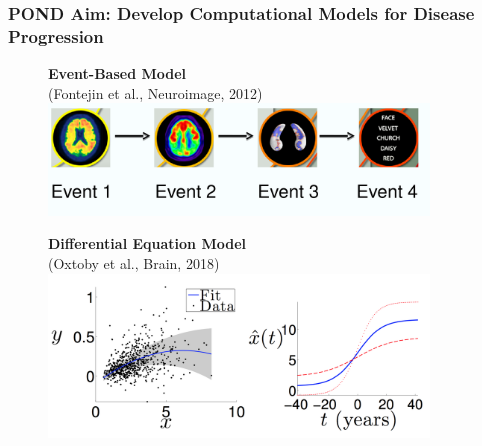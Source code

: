 \documentclass[8pt,xcolor=table]{beamer}
\begin{document}
\begin{frame}
\frametitle{POND Aim: Develop Computational Models for Disease Progression}

\newcommand{\mnpHeight}{3cm}

\vspace{-3em}
  
  
  \hspace{-2em}
  \begin{small}
  \begin{figure}[h]
  \centering
    \begin{minipage}[t][\mnpHeight][t]{0.49\linewidth}
  \centering
    \textbf{Event-Based Model}\\ \footnotesize{(Fontejin et al., Neuroimage, 2012)}\\    
    \includegraphics[width=0.9\textwidth,trim=0 0 0 0,clip]{ebm_openday}
      \vspace{1em}
  \end{minipage}
  \begin{minipage}[t][\mnpHeight][t]{0.49\linewidth}
    \centering
    \textbf{Differential Equation Model}\\ \footnotesize{(Oxtoby et al., Brain, 2018)}
    \includegraphics[width=0.9\textwidth,trim=0 0 0 0, clip]{dem_neil}
  \end{minipage}


\end{figure}
\end{small}
\end{frame}
\end{document}

